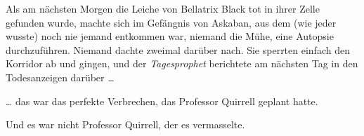 Als am nächsten Morgen die Leiche von Bellatrix Black tot in ihrer Zelle gefunden wurde, machte sich im Gefängnis von Askaban, aus dem (wie jeder wusste) noch nie jemand entkommen war, niemand die Mühe, eine Autopsie durchzuführen. Niemand dachte zweimal darüber nach. Sie sperrten einfach den Korridor ab und gingen, und der \emph{Tagesprophet} berichtete am nächsten Tag in den Todesanzeigen darüber …

… das war das perfekte Verbrechen, das Professor Quirrell geplant hatte.

Und es war nicht Professor Quirrell, der es vermasselte.
